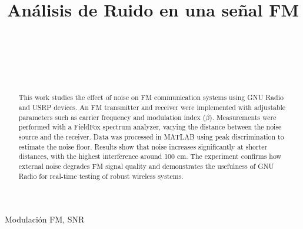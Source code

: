 \documentclass[conference]{IEEEtran}
\begin{document}
	
	\title{Análisis de Ruido en una señal FM}
	\author{
		\\
		\\
		\\
		\\
		\and
		\and
		\and
		
	}
	
	\maketitle
	\begin{abstract}
		This work studies the effect of noise on FM communication systems using GNU Radio and USRP devices. An FM transmitter and receiver were implemented with adjustable parameters such as carrier frequency and modulation index ($\beta$). Measurements were performed with a FieldFox spectrum analyzer, varying the distance between the noise source and the receiver. Data was processed in MATLAB using peak discrimination to estimate the noise floor. Results show that noise increases significantly at shorter distances, with the highest interference around 100 cm. The experiment confirms how external noise degrades FM signal quality and demonstrates the usefulness of GNU Radio for real-time testing of robust wireless systems.	
	\end{abstract}
	
	\begin{IEEEkeywords}
		Modulación FM, SNR
	\end{IEEEkeywords}
	
\end{document}
